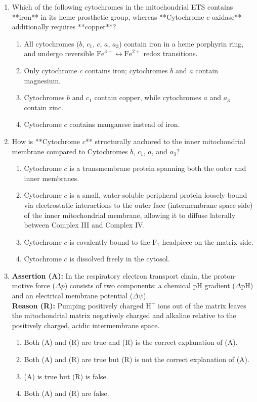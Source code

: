 \documentclass[11pt, a4paper]{article}
\begin{document}
\begin{enumerate}[label=\textbf{\arabic*.}]
\item Which of the following cytochromes in the mitochondrial ETS contains **iron** in its heme prosthetic group, whereas **Cytochrome $c$ oxidase** additionally requires **copper**?
\begin{enumerate}[label=(\Alph*)]
    \item All cytochromes ($b$, $c_1$, $c$, $a$, $a_3$) contain iron in a heme porphyrin ring, and undergo reversible $\text{Fe}^{3+} \leftrightarrow \text{Fe}^{2+}$ redox transitions.
    \item Only cytochrome $c$ contains iron; cytochromes $b$ and $a$ contain magnesium.
    \item Cytochromes $b$ and $c_1$ contain copper, while cytochromes $a$ and $a_3$ contain zinc.
    \item Cytochrome $c$ contains manganese instead of iron.
\end{enumerate}

\item How is **Cytochrome $c$** structurally anchored to the inner mitochondrial membrane compared to Cytochromes $b$, $c_1$, $a$, and $a_3$?
\begin{enumerate}[label=(\Alph*)]
    \item Cytochrome $c$ is a transmembrane protein spanning both the outer and inner membranes.
    \item Cytochrome $c$ is a small, water-soluble peripheral protein loosely bound via electrostatic interactions to the outer face (intermembrane space side) of the inner mitochondrial membrane, allowing it to diffuse laterally between Complex III and Complex IV.
    \item Cytochrome $c$ is covalently bound to the $\text{F}_1$ headpiece on the matrix side.
    \item Cytochrome $c$ is dissolved freely in the cytosol.
\end{enumerate}

\item \textbf{Assertion (A):} In the respiratory electron transport chain, the proton-motive force ($\Delta p$) consists of two components: a chemical pH gradient ($\Delta \text{pH}$) and an electrical membrane potential ($\Delta \psi$). \\
\textbf{Reason (R):} Pumping positively charged $\text{H}^+$ ions out of the matrix leaves the mitochondrial matrix negatively charged and alkaline relative to the positively charged, acidic intermembrane space.
\begin{enumerate}[label=(\Alph*)]
    \item Both (A) and (R) are true and (R) is the correct explanation of (A).
    \item Both (A) and (R) are true but (R) is not the correct explanation of (A).
    \item (A) is true but (R) is false.
    \item Both (A) and (R) are false.
\end{enumerate}


\end{enumerate}
\end{document}
